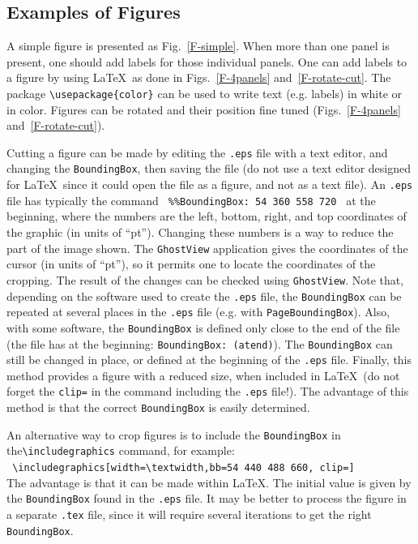 \documentclass[namedreferences,hyperref,optionalrh]{spr-sola}
\begin{document}
\subsection{Examples of Figures} %
\label{S-figures}
 A simple figure is presented as Fig.~\ref{F-simple}. When more
than one panel is present, one should add labels for those individual panels.
One can add labels to a figure by using \LaTeX\ as done
in Figs.~\ref{F-4panels} and~\ref{F-rotate-cut}. 
The package \verb+\usepackage{color}+
can be used to write text (e.g. labels) in white or in color. 
Figures can be rotated and their position fine tuned 
(Figs.~\ref{F-4panels} and~\ref{F-rotate-cut}).

  Cutting a figure can be made by editing the \texttt{.eps} 
file with a text editor, and changing the \texttt{BoundingBox}, 
then saving the file (do not use a text editor designed for \LaTeX\ since 
it could open the file as a figure, and not as a text file).
An \texttt{.eps} file has typically the command
\verb+ %%BoundingBox: 54 360 558 720 + 
at the beginning, where the numbers are the left, bottom, right, and top
coordinates of the graphic (in units of ``pt'').  
Changing these numbers is a way to reduce the part of the image shown. 
The \texttt{GhostView} application gives the coordinates
of the cursor (in units of ``pt''), so it permits one to locate the 
coordinates of the cropping. 
The result of the changes can be checked using \texttt{GhostView}. 
 Note that, depending on the software used to create the \texttt{.eps} file, 
the \texttt{BoundingBox} can be repeated at several places in the
\texttt{.eps} file (e.g. with \texttt{PageBoundingBox}). 
Also, with some software,
the \texttt{BoundingBox} is defined only close to the end of the file
(the file has at the beginning: \texttt{BoundingBox: (atend)}).
The \texttt{BoundingBox} can still be changed
in place, or defined at the beginning of the \texttt{.eps} file. 
   Finally, this method provides a figure with a reduced size, when
included in \LaTeX\ (do not forget the \texttt{clip=} 
in the command including the \texttt{.eps} file!).     
The advantage of this method is that the correct \texttt{BoundingBox}
is easily determined.

   An alternative way to crop figures is to include the \texttt{BoundingBox}
in the\linebreak \verb+\includegraphics+ command, for example:\\
\verb+ \includegraphics[width=\textwidth,bb=54 440 488 660, clip=]+ \\
  The advantage
is that it can be made within \LaTeX . The initial value is given
by the \texttt{BoundingBox} found in the \texttt{.eps} file.
It may be better to process the
figure in a separate \texttt{.tex} file, since it will require several 
iterations to get the right \texttt{BoundingBox}.
   
\end{document}
